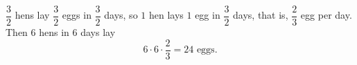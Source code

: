 $\dfrac32$ hens lay $\dfrac32$ eggs in $\dfrac32$ days, so $1$ hen lays $1$ egg in $\dfrac32$ days, that is, $\dfrac23$ egg per day. Then $6$ hens in $6$ days lay
\[6\cdot6\cdot\dfrac23=\boxed{24}\text{ eggs}.\]
